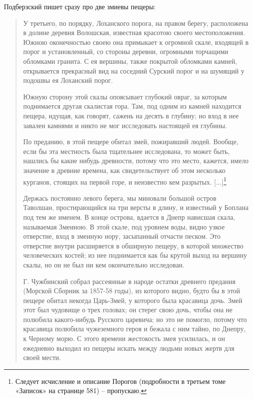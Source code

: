 Подберзский пишет сразу про две змиевы пещеры:

\begin{quotation}
У третьего, по порядку, Лоханского порога, на правом берегу, расположена в долине деревня Волошская, известная красотою своего местоположения. Южною оконечностью своею она примыкает к огромной скале, входящей в порог и установленный, со стороны деревни, огромными торчащими обломками гранита. С ея вершины, также покрытой обломками камней, открывается прекрасный вид на соседний Сурский порог и на шумящий у подошвы ея Лоханский порог.

Южную сторону этой скалы опоясывает глубокий овраг, за которым поднимается другая скалистая гора. Там, под одним из камней находится пещера, идущая, как говорят, сажень на десять в глубину; но вход в нее завален камнями и никто не мог исследовать настоящей ея глубины.

По преданию, в этой пещере обитал змей, пожиравший людей. Вообще, если бы эта местность была тщательнее исследована, то может быть, нашлись бы какие нибудь древности, потому что это место, кажется, имело значение в древние времена, как свидетельствует об этом несколько курганов, стоящих на первой горе, и неизвестно кем разрытых. [...]\footnote{Следует исчисление и описание Порогов (подробности в третьем томе «Записок» на странице 581) – пропускаю.}

Держась постоянно левого берега, мы миновали большой остров Таволшан, простирающийся на три версты в длину, и известный у Боплана под тем же именем. В конце острова, вдается в Днепр нависшая скала, называемая Змеиною. В этой скале, под уровнем воды, видно узкое отверстие, вход в змеиную нору, засыпанный отчасти песком. Это отверстие внутри расширяется в обширную пещеру, в которой множество человеческих костей; из нее поднимается как бы крутой выход на вершину скалы, но он не был ни кем окончательно исследован.

Г. Чужбинский собрал рассеянные в народе остатки древнего предания (Морской Сборник за 1857-58 годы), из которого видно, будто бы в этой пещере обитал некогда Царь-Змей, у которого была красавица дочь. Змей этот был чудовище о трех головах; он стерег свою дочь, чтобы она не полюбила какого-нибудь Русского царевича; но это не помогло, потому что красавица полюбила чужеземного героя и бежала с ним тайно, по Днепру, к Черному морю. С этого времени жестокость змея усилилась, и он ежедневно выходил из пещеры искать между людьми новых жертв для своей мести. 
\end{quotation}

